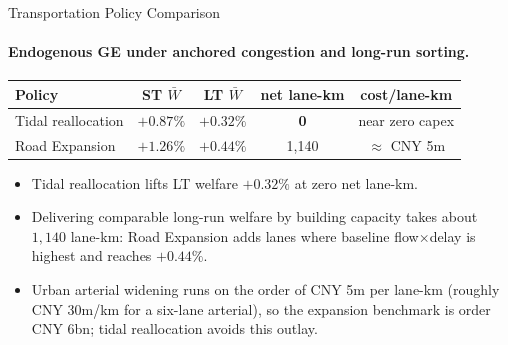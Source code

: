 \documentclass[11pt,aspectratio=169]{beamer}
\newcommand{\good}[1]{\textcolor{blue!70!black}{#1}}
\newcommand{\app}[1]{\allowbreak\hspace{0.25em}\hyperlink{#1}{\beamergotobutton{details}}}
\begin{document}
\begin{frame}[label=result4]{Transportation Policy Comparison}
\framesubtitle{Endogenous GE under anchored congestion and long-run sorting.}
\begin{center}\scriptsize
\begin{tabular}{lcccc}
\toprule
Policy & ST $\bar W$ & LT $\bar W$ & net lane-km & cost/lane-km \\
\midrule
Tidal reallocation & $+0.87\%$ & $+0.32\%$ & \good{\textbf{0}} & near zero capex \\
Road Expansion & $+1.26\%$ & $+0.44\%$ & 1{,}140 & $\approx$ CNY 5m \\
\bottomrule
\end{tabular}
\end{center}
\vspace{0.3em}
\begin{itemize}\footnotesize
  \item Tidal reallocation lifts LT welfare $+0.32\%$ at zero net lane-km.
  \item Delivering comparable long-run welfare by building capacity takes about $1{,}140$ lane-km: Road Expansion adds lanes where baseline flow$\times$delay is highest and reaches $+0.44\%$.
  \item Urban arterial widening runs on the order of CNY 5m per lane-km (roughly CNY 30m/km for a six-lane arterial), so the expansion benchmark is order CNY 6bn; tidal reallocation avoids this outlay. \app{apppolicy}
\end{itemize}
\end{frame}
\end{document}
